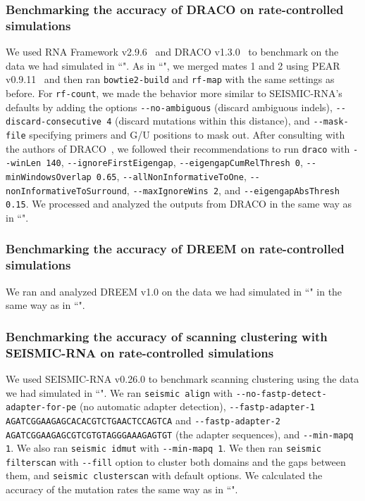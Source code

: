 \documentclass[unnumsec,webpdf,contemporary,large]{oup-authoring-template}%
\theoremstyle{thmstyleone}%
\theoremstyle{thmstyletwo}%
\theoremstyle{thmstylethree}%
\begin{document}
\subsubsection{Benchmarking the accuracy of DRACO on rate-controlled simulations}
\label{benchmark-accuracy-draco-fixed}

We used RNA Framework v2.9.6~\cite{Incarnato2018} and DRACO v1.3.0~\cite{Morandi2021} to benchmark on the data we had simulated in ``".
As in ``", we merged mates 1 and 2 using PEAR v0.9.11~\cite{Zhang2013} and then ran \verb|bowtie2-build| and \verb|rf-map| with the same settings as before.
For \verb|rf-count|, we made the behavior more similar to SEISMIC-RNA's defaults by adding the options \verb|--no-ambiguous| (discard ambiguous indels), \verb|--discard-consecutive 4| (discard mutations within this distance), and \verb|--mask-file| specifying primers and G/U positions to mask out.
After consulting with the authors of DRACO~\cite{Morandi2021}, we followed their recommendations to run \verb|draco| with \verb|--winLen 140|, \verb|--ignoreFirstEigengap|, \verb|--eigengapCumRelThresh 0|, \verb|--minWindowsOverlap 0.65|, \verb|--allNonInformativeToOne|, \verb|--nonInformativeToSurround|, \verb|--maxIgnoreWins 2|, and \verb|--eigengapAbsThresh 0.15|.
We processed and analyzed the outputs from DRACO in the same way as in ``".

\subsubsection{Benchmarking the accuracy of DREEM on rate-controlled simulations}

We ran and analyzed DREEM v1.0 on the data we had simulated in ``" in the same way as in ``".

\subsubsection{Benchmarking the accuracy of scanning clustering with SEISMIC-RNA on rate-controlled simulations}

We used SEISMIC-RNA v0.26.0 to benchmark scanning clustering using the data we had simulated in ``".
We ran \verb|seismic align| with \verb|--no-fastp-detect-adapter-for-pe| (no automatic adapter detection), \verb|--fastp-adapter-1 AGATCGGAAGAGCACACGTCTGAACTCCAGTCA| and \verb|--fastp-adapter-2 AGATCGGAAGAGCGTCGTGTAGGGAAAGAGTGT| (the adapter sequences), and \verb|--min-mapq 1|.
We also ran \verb|seismic idmut| with \verb|--min-mapq 1|.
We then ran \verb|seismic filterscan| with \verb|--fill| option to cluster both domains and the gaps between them, and \verb|seismic clusterscan| with default options.
We calculated the accuracy of the mutation rates the same way as in ``".
\end{document}
